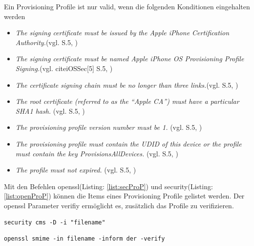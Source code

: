 Ein Provisioning Profile ist nur \glqq valid\grqq, wenn die folgenden Konditionen eingehalten werden
   
\begin{itemize}
    \item \glqq \textit{The signing certificate must be issued by the Apple iPhone Certification Authority.}\grqq{}(vgl. \cite{iOSSec[5]} S.5, \cite{Hacking[1]})    
    
    \item  \glqq \textit{The signing certificate must be named Apple iPhone OS Provisioning Profile Signing.}\grqq{}(vgl. cite{iOSSec[5]} S.5, \cite{Hacking[1]})
    
    \item  \glqq \textit{The certificate signing chain must be no longer than three links.}\grqq{}(vgl. \cite{iOSSec[5]} S.5, \cite{Hacking[1]})     
    
    \item  \glqq \textit{The root certificate (referred to as the “Apple CA”) must have a particular SHA1 hash.}\grqq{} (vgl. \cite{iOSSec[5]} S.5, \cite{Hacking[1]})    
    
    \item  \glqq \textit{The provisioning profile version number must be 1.}\grqq{} (vgl. \cite{iOSSec[5]} S.5, \cite{Hacking[1]})
    
    \item  \glqq \textit{The provisioning profile must contain the UDID of this device or the profile must contain the key ProvisionsAllDevices.}\grqq{} (vgl. \cite{iOSSec[5]} S.5, \cite{Hacking[1]})    
    
    \item  \glqq \textit{The profile must not expired.}\grqq{} (vgl.\cite{iOSSec[5]} S.5, \cite{Hacking[1]})
\end{itemize}

Mit den Befehlen openssl(Listing: \ref{list:secProP}) und security(Listing: \ref{list:openProP}) können die Items eines Provisioning Profile gelistet werden. Der openssl Parameter \glqq verifiy\grqq{} ermöglicht es, zusätzlich das Profile zu verifizieren. 
\newline

\lstset{
    language=bash,
    }
\begin{lstlisting}[captionpos=b, caption={Befehl: security}, label=list:secProP]
security cms -D -i "filename" 
\end{lstlisting}

\begin{lstlisting}[captionpos=b, caption={Befehl: openssl -- Output Figure: \ref{fig:ProvisioningProfile} }, label=list:openProP]
openssl smime -in filename -inform der -verify
\end{lstlisting}

